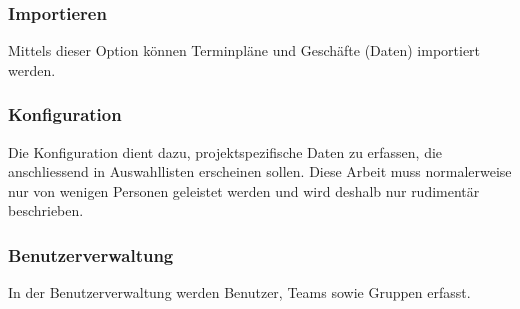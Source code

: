 \subsubsection{Importieren}

Mittels dieser Option können Terminpläne und Geschäfte (Daten) importiert werden.

\subsubsection{Konfiguration}

Die Konfiguration dient dazu, projektspezifische Daten zu erfassen, die anschliessend in Auswahllisten erscheinen sollen. Diese Arbeit muss normalerweise nur von wenigen Personen geleistet werden und wird deshalb nur rudimentär beschrieben.

\subsubsection{Benutzerverwaltung}

In der Benutzerverwaltung werden Benutzer, Teams sowie Gruppen erfasst.

